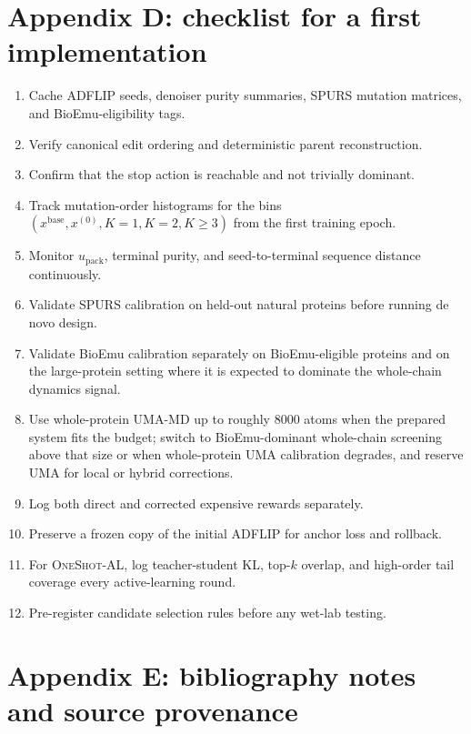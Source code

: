 \documentclass[11pt]{article}
\newcommand{\packunc}{\ensuremath{u_{\mathrm{pack}}}}
\newcommand{\methodIII}{\textsc{OneShot-AL}}
\begin{document}
\section{Appendix D: checklist for a first implementation}

\begin{enumerate}[leftmargin=1.5em]
    \item Cache ADFLIP seeds, denoiser purity summaries, SPURS mutation matrices, and BioEmu-eligibility tags.
    \item Verify canonical edit ordering and deterministic parent reconstruction.
    \item Confirm that the stop action is reachable and not trivially dominant.
    \item Track mutation-order histograms for the bins $(x^{\mathrm{base}},x^{(0)},K=1,K=2,K\ge 3)$ from the first training epoch.
    \item Monitor \packunc{}, terminal purity, and seed-to-terminal sequence distance continuously.
    \item Validate SPURS calibration on held-out natural proteins before running de novo design.
    \item Validate BioEmu calibration separately on BioEmu-eligible proteins and on the large-protein setting where it is expected to dominate the whole-chain dynamics signal.
    \item Use whole-protein UMA-MD up to roughly $8000$ atoms when the prepared system fits the budget; switch to BioEmu-dominant whole-chain screening above that size or when whole-protein UMA calibration degrades, and reserve UMA for local or hybrid corrections.
    \item Log both direct and corrected expensive rewards separately.
    \item Preserve a frozen copy of the initial ADFLIP for anchor loss and rollback.
    \item For \methodIII{}, log teacher-student KL, top-$k$ overlap, and high-order tail coverage every active-learning round.
    \item Pre-register candidate selection rules before any wet-lab testing.
\end{enumerate}

\section{Appendix E: bibliography notes and source provenance}
\end{document}

